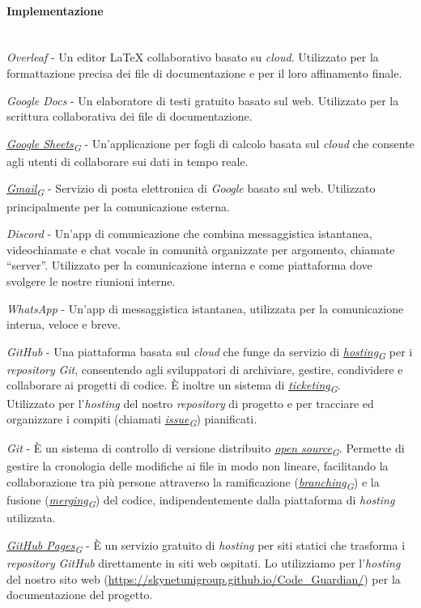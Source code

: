 \documentclass[12pt, a4paper]{article}
\newcommand{\urlglossario}{https://skynetunigroup.github.io/Code_Guardian/Documentazione/PB/glossario_v2.0.0.pdf} %
\newcommand{\glo}[2]{\href{\urlglossario\#nameddest=#2}{#1\textsubscript{G}}}
\begin{document}
 \paragraph{Implementazione}\mbox{}\\
 \textit{Overleaf} - Un editor \LaTeX{} collaborativo basato su \textit{cloud}. Utilizzato per la formattazione precisa dei file di documentazione e per il loro affinamento finale.

 \textit{Google Docs} - Un elaboratore di testi gratuito basato sul web. Utilizzato per la scrittura collaborativa dei file di documentazione.

 \textit{\glo{Google Sheets}{google-sheets}} - Un'applicazione per fogli di calcolo basata sul \textit{cloud} che consente agli utenti di collaborare sui dati in tempo reale.
 
 \textit{\glo{Gmail}{gmail}} - Servizio di posta elettronica di \textit{Google} basato sul web. Utilizzato principalmente per la comunicazione esterna.
 
 \textit{Discord} - Un'app di comunicazione che combina messaggistica istantanea, videochiamate e chat vocale in comunità organizzate per argomento, chiamate ``server''. Utilizzato per la comunicazione interna e come piattaforma dove svolgere le nostre riunioni interne.
 
 \textit{WhatsApp} - Un'app di messaggistica istantanea, utilizzata per la comunicazione interna, veloce e breve.
 
 \textit{GitHub} - Una piattaforma basata sul \textit{cloud} che funge da servizio di \textit{\glo{hosting}{hosting}} per i \textit{repository} \textit{Git}, consentendo agli sviluppatori di archiviare, gestire, condividere e collaborare ai progetti di codice. È inoltre un sistema di \textit{\glo{ticketing}{ticketing}}.\\
Utilizzato per l'\textit{hosting} del nostro \textit{repository} di progetto e per tracciare ed organizzare i compiti (chiamati \textit{\glo{issue}{issue}}) pianificati.

 \textit{Git} - È un sistema di controllo di versione distribuito \textit{\glo{open source}{open-source}}. Permette di gestire la cronologia delle modifiche ai file in modo non lineare, facilitando la collaborazione tra più persone attraverso la ramificazione (\textit{\glo{branching}{branching}}) e la fusione (\textit{\glo{merging}{merging}}) del codice, indipendentemente dalla piattaforma di \textit{hosting} utilizzata.

 \textit{\glo{GitHub Pages}{github-pages}} - È un servizio gratuito di \textit{hosting} per siti statici che trasforma i \textit{repository} \textit{GitHub} direttamente in siti web ospitati. Lo utilizziamo per l'\textit{hosting} del nostro sito web (\href{https://skynetunigroup.github.io/Code_Guardian/}{ {https://skynetunigroup.github.io/Code\_Guardian/}}) per la documentazione del progetto.
\end{document}
